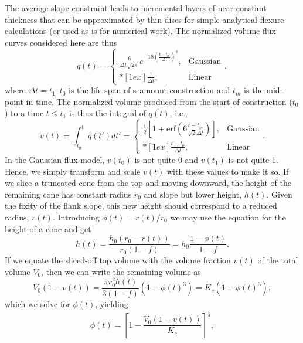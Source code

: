 The average slope constraint leads to
incremental layers of near-constant thickness that can be approximated by thin discs for simple analytical
flexure calculations (or used as is for numerical work). The normalized volume flux curves considered here are thus
\begin{equation*}
q(t) = \left \{ \begin{array}{cl}
	\frac{6}{\Delta t \sqrt{2 \pi}} e^{-18\left (\frac{t - t_m}{\Delta t} \right )^2}, &	\mbox{Gaussian} \\*[1ex]
	\frac{1}{\Delta t}, & \mbox{Linear}
\end{array} \right.,
\end{equation*}
where $\Delta t = t_1 – t_0$ is the life span of seamount construction and $t_m$ is the mid-point in time.
The normalized volume produced from the start of construction ($t_0$) to a time $t \leq t_1$ is thus the
integral of $q(t)$, i.e.,
\begin{equation}
v(t) = \int_{t_0}^t q(t')dt' = \left \{ \begin{array}{cl}
	\frac{1}{2} \left [ 1 + \mbox{erf}{\left (6\frac{t - t_m}{\sqrt{2}\Delta t} \right )} \right ], &	\mbox{Gaussian} \\*[1ex]
	\frac{t - t_0}{\Delta t}, & \mbox{Linear}
\end{array} \right ..
\label{eq:flux}
\end{equation}
In the Gaussian flux model, $v(t_0)$ is not quite 0 and $v(t_1)$ is not quite 1. Hence, we simply transform
and scale $v(t)$ with these values to make it so.
If we slice a truncated cone from the top and moving downward, the height of the remaining cone has constant
radius $r_0$ and slope but lower height, $h(t)$.  Given the fixity of the flank slope, this new height
should correspond to a reduced radius, $r(t)$.  Introducing
$\phi(t) = r(t)/r_0$ we may use the equation for the height of a cone and get
\begin{equation*}
h(t) = \frac{h_0 (r_0 - r(t))}{r_0 (1-f)} = h_0\frac{1 - \phi(t)}{1 - f}.
\end{equation*}
If we equate the sliced-off top volume with the volume fraction $v(t)$ of the total volume $V_0$,
then we can write the remaining volume as
\begin{equation*}
V_0 (1 - v(t)) = \frac{\pi r_0^2 h(t)}{3 (1-f)} (1 - \phi(t)^3) = K_c (1 - \phi(t)^3),
\end{equation*}
which we solve for $\phi(t)$, yielding
\begin{equation*}
\phi(t) = \left [1 - \frac{V_0 (1 - v(t))}{K_c} \right ]^{\frac{1}{3}},
\end{equation*}
